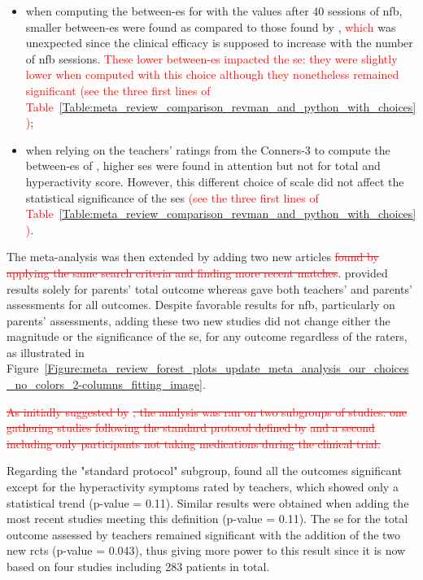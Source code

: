 \begin{itemize}
    \item when computing the between-\gls{es} for \citet{Arnold2014} with the values after 40 sessions of \gls{nfb}, 
      smaller between-\gls{es} were found as compared to those found by \citet{Cortese2016}, \textcolor{red}{which} was unexpected since  
			the clinical efficacy is supposed to increase with the number of \gls{nfb} sessions. \textcolor{red}{These lower between-\gls{es}
			impacted the \gls{se}: they were slightly lower when computed with this choice although they nonetheless remained significant (see the three first lines 
			of Table~\ref{Table:meta_review_comparison_revman_and_python_with_choices})};  
    \item when relying on the teachers' ratings from the Conners-3 to compute the between-\gls{es} of \citet{Steiner2014}, 
		higher \glspl{se} were found in attention but not for total and hyperactivity score. However, this different choice of 
		scale did not affect the statistical significance of the \glspl{se} \textcolor{red}{(see the three first lines 
			of Table~\ref{Table:meta_review_comparison_revman_and_python_with_choices})}.
\end{itemize}

The meta-analysis was then extended by adding two new articles \citep{Strehl2017, Baumeister2016} \textcolor{red}{\sout{found 
by applying the same search criteria and finding more recent matches}}. \citet{Baumeister2016} provided results 
solely for parents' total outcome whereas \citet{Strehl2017} gave both teachers' and parents' assessments for all outcomes. 
Despite favorable results for \gls{nfb}, particularly on parents' assessments, adding these two new studies did not 
change either the magnitude or the significance of the \gls{se}, for any outcome regardless of the raters,
as illustrated in Figure~\ref{Figure:meta_review_forest_plots_update_meta_analysis_our_choices_no_colors_2-columns_fitting_image}. 
 
\textcolor{red}{\sout{As initially suggested by }}\citeauthor{Cortese2016}\textcolor{red}{\sout{, the analysis was ran on two subgroups of studies: one gathering 
studies following the standard protocol defined by }} \citet{Arns2014} \textcolor{red}{\sout{and a second including only participants not taking medications 
during the clinical trial. }}

Regarding the "standard protocol" subgroup, \citet{Cortese2016} found all the outcomes significant except for the 
hyperactivity symptoms rated by teachers, which showed only a statistical trend (p-value = 0.11). Similar results 
were obtained when adding the most recent studies meeting this definition \citep{Strehl2017} (p-value = 0.11). 
The \gls{se} for the total outcome assessed by teachers remained significant with the addition of the two new
\glspl{rct} (p-value = 0.043), thus giving more power to this result since it is now based on four studies including 283
patients in total.

